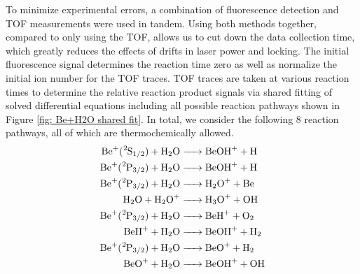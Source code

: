 To minimize experimental errors, a combination of fluorescence detection and TOF measurements were used in tandem. Using both methods together, compared to only using the TOF, allows us to cut down the data collection time, which greatly reduces the effects of drifts in laser power and locking. The initial fluorescence signal determines the reaction time zero as well as normalize the initial ion number for the TOF traces. TOF traces are taken at various reaction times to determine the relative reaction product signals via shared fitting of solved differential equations including all possible reaction pathways shown in Figure \ref{fig: Be+H2O shared fit}. In total, we consider the following 8 reaction pathways, all of which are thermochemically allowed.
\begin{align}
	\ce{Be+(^2S1/2) + H2O & -> BeOH+ + H} \label{r: Be(S)+H2O->BeOH} \\
	\ce{Be+(^2P3/2) + H2O & -> BeOH+ + H} \label{r: Be(P)+H2O->BeOH} \\
	\ce{Be+(^2P3/2) + H2O & -> H2O+ + Be} \label{r: Be(P)+H2O->H2O} \\
	\ce{H2O + H2O+ & -> H3O+ + OH} \label{r: H2O+H2O->H3O} \\
	\ce{Be+(^2P3/2) + H2O & -> BeH+ + O2} \label{r: Be(P)+H2O->BeH} \\
	\ce{BeH+ + H2O & -> BeOH+ + H2} \label{r: BeH+H2O->BeOH} \\
	\ce{Be+(^2P3/2) + H2O & -> BeO+ + H2} \label{r: Be(P)+H2O->BeO} \\
	\ce{BeO+ + H2O & -> BeOH+ + OH} \label{r: BeO+H2O->BeOH}
\end{align}
